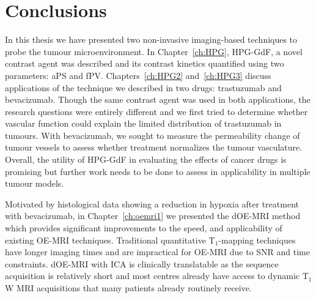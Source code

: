 
\section{Conclusions}

In this thesis we have presented two non-invasive imaging-based techniques to probe the tumour microenvironment.
In Chapter~\ref{ch:HPG}, \acs{HPG-GdF}, a novel contrast agent was described and its contrast kinetics quantified using two parameters: \acs{aPS} and \acs{fPV}. 
Chapters~\ref{ch:HPG2} and~\ref{ch:HPG3} discuss applications of the technique we described in two drugs: trastuzumab and bevacizumab. 
Though the same contrast agent was used in both applications, the research questions were entirely different and we first tried to determine whether vascular function could explain the limited distribution of trastuzumab in tumours.
With bevacizumab, we sought to measure the permeability change of tumour vessels to assess whether treatment normalizes the tumour vasculature.
Overall, the utility of \acs{HPG-GdF} in evaluating the effects of cancer drugs is promising but further work needs to be done to assess in applicability in multiple tumour models.

Motivated by histological data showing a reduction in hypoxia after treatment with bevacizumab, in Chapter~\ref{ch:oemri1} we presented the \acs{dOE-MRI} method which provides significant improvements to the speed, and applicability of existing \acs{OE-MRI} techniques. 
Traditional quantitative T$_1$-mapping techniques have longer imaging times and are impractical for \acs{OE-MRI} due to \acs{SNR} and time constraints.
\acs{dOE-MRI} with \acs{ICA} is clinically translatable as the sequence acquisition is relatively short and most centres already have access to dynamic T$_1$W MRI acquisitions that many patients already routinely receive. 

